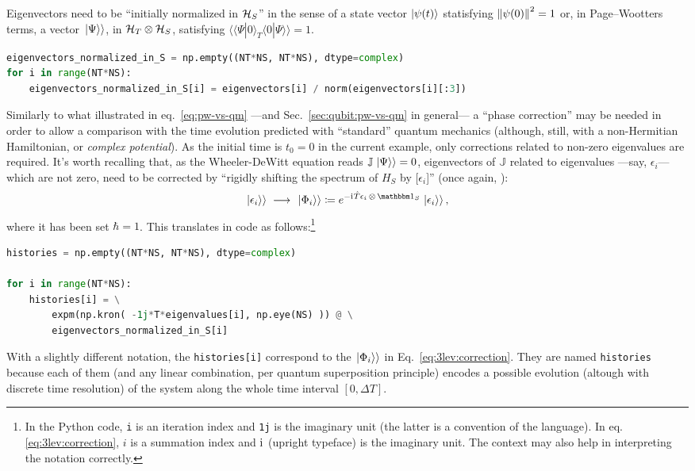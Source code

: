 Eigenvectors need to be ``initially normalized in $\mathcal{H}_S$'' in the sense
of a state vector $\ket{\psi(t)}$ statisfying
$\norm{\psi(0)}^2=1$ or,
 in Page--Wootters terms,
 a vector $\left.\left| \Psi \right\rangle\right\rangle$, in $\mathcal{H}_T \otimes \mathcal{H}_S$, satisfying
 $\langle\langle \Psi | 0 \rangle_{T}\langle 0 | \Psi \rangle \rangle = 1$.
\begin{lstlisting}[language=Python]
eigenvectors_normalized_in_S = np.empty((NT*NS, NT*NS), dtype=complex)
for i in range(NT*NS):
    eigenvectors_normalized_in_S[i] = eigenvectors[i] / norm(eigenvectors[i][:3])
\end{lstlisting}

Similarly to what illustrated in eq.~\eqref{eq:pw-vs-qm} ---and Sec.~\ref{sec:qubit:pw-vs-qm} in general---
a ``phase correction'' may be needed in order to allow a comparison with
the time evolution predicted with ``standard'' quantum mechanics
(although, still, with a non-Hermitian Hamiltonian, or \emph{complex potential}).
As the initial time is $t_0=0$ in the current example, only
corrections related to non-zero eigenvalues are required.
It's worth recalling that,
as the Wheeler-DeWitt equation reads $\mathbb{J} \left.\left| \Psi \right\rangle\right\rangle = 0$,
eigenvectors of $\mathbb{J}$ related to eigenvalues ---say, $\epsilon_{i}$---
which are not zero,
need to be corrected by ``rigidly shifting the spectrum of $H_{S}$
by [$\epsilon_{i}$]'' (once again, \cite[``\textit{The Zero-eigenvalue}'']{Lloyd:Time}):
\begin{equation}
  \dket{\epsilon_i} \;\longrightarrow\; \dket{\Phi_{i}} \eqbydef e^{ -\iu \hat{T} \epsilon_{i} \, \ox \, \idop_{S}} \dket{\epsilon_{i}} \text{,}
  \label{eq:3lev:correction}
\end{equation}
where it has been set $\hbar=1$. This translates in code as follows:\footnote{
  In the Python code, \Verb+i+ is an iteration index and \Verb|1j| is the imaginary unit
  (the latter is a convention of the language).
  In eq.\eqref{eq:3lev:correction},
  $i$ is a summation index and $\mathrm{i}\mkern1mu$ (upright typeface) is the imaginary unit.
  The context may also help in interpreting the notation correctly.
}
\begin{lstlisting}[language=Python]
histories = np.empty((NT*NS, NT*NS), dtype=complex)

for i in range(NT*NS):
    histories[i] = \
        expm(np.kron( -1j*T*eigenvalues[i], np.eye(NS) )) @ \
        eigenvectors_normalized_in_S[i]
\end{lstlisting}
%
With a slightly different notation,
the \Verb|histories[i]|
correspond to the $\left.\left| \Phi_i \right\rangle\right\rangle$ in Eq.~\eqref{eq:3lev:correction}.
They are named \Verb!histories! because each of them
(and any linear combination, per quantum superposition principle)
encodes a possible evolution (altough with discrete time resolution)
of the system along the whole time interval $[0, \Delta T]$.

